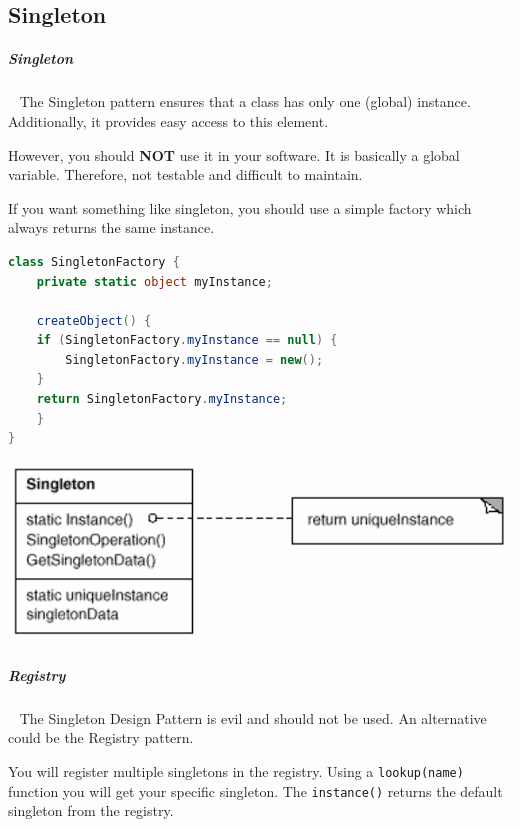 \documentclass[11pt,twoside,landscape]{article}
\begin{document}
\begin{multicols}{3}
\section{Singleton}
\label{sec:orgf455374}
\subparagraph{Singleton} \
\label{sec:orgac20113}
The Singleton pattern ensures that a class has only one (global) instance.
Additionally, it provides easy access to this element.

However, you should \textbf{NOT} use it in your software.
It is basically a global variable.
Therefore, not testable and difficult to maintain.

If you want something like singleton, you should use a simple factory which always returns the same instance.


\begin{lstlisting}[language=csharp,label=lst:singelton-alternative-in-code,caption={Singelton alternative in code},captionpos=b,numbers=none]
class SingletonFactory {
    private static object myInstance;

    createObject() {
	if (SingletonFactory.myInstance == null) {
	    SingletonFactory.myInstance = new();
	}
	return SingletonFactory.myInstance;
    }
}
\end{lstlisting}

{
\begin{center}
\includegraphics[width=.9\linewidth]{img/singleton.png}
\end{center}
\label{fig:singelton-class-diagram}
}
\subparagraph{Registry} \
\label{sec:orgec597ec}
The Singleton Design Pattern is evil and should not be used.
An alternative could be the Registry pattern.

You will register multiple singletons in the registry.
Using a \texttt{lookup(name)} function you will get your specific singleton.
The \texttt{instance()} returns the default singleton from the registry.



\end{multicols}
\end{document}

